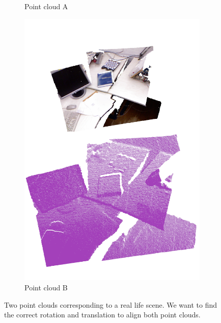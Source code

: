\begin{figure}[H]
\begin{subfigure}[b]{0.5\textwidth}
\caption{Point cloud A}
\end{subfigure}
\begin{subfigure}[b]{0.5\textwidth}
\includegraphics[scale=0.3]{images/two_clouds_2}
\caption{Point cloud B}
\end{subfigure}
\caption{Two point clouds corresponding to a real life scene. We want to find the correct rotation and translation to align both point clouds.}
\end{figure}

